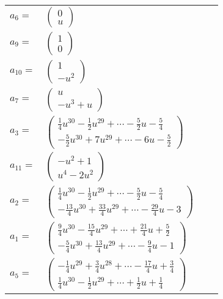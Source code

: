 \documentclass[1p]{elsarticle_modified}
\theoremstyle{definition}
\begin{document}
\begin{tabular}{m{7pt} m{180pt} m{7pt} m{180pt} }
\flushright $a_{6}=$&$\begin{pmatrix}0\\u\end{pmatrix}$ \\
\flushright $a_{9}=$&$\begin{pmatrix}1\\0\end{pmatrix}$ \\
\flushright $a_{10}=$&$\begin{pmatrix}1\\- u^2\end{pmatrix}$ \\
\flushright $a_{7}=$&$\begin{pmatrix}u\\- u^3+u\end{pmatrix}$ \\
\flushright $a_{3}=$&$\begin{pmatrix}\frac{1}{4} u^{30}-\frac{1}{2} u^{29}+\cdots-\frac{5}{2} u-\frac{5}{4}\\-\frac{5}{2} u^{30}+7 u^{29}+\cdots-6 u-\frac{5}{2}\end{pmatrix}$ \\
\flushright $a_{11}=$&$\begin{pmatrix}- u^2+1\\u^4-2 u^2\end{pmatrix}$ \\
\flushright $a_{2}=$&$\begin{pmatrix}\frac{1}{4} u^{30}-\frac{1}{2} u^{29}+\cdots-\frac{5}{2} u-\frac{5}{4}\\-\frac{13}{4} u^{30}+\frac{33}{4} u^{29}+\cdots-\frac{29}{4} u-3\end{pmatrix}$ \\
\flushright $a_{1}=$&$\begin{pmatrix}\frac{9}{4} u^{30}-\frac{15}{4} u^{29}+\cdots+\frac{21}{4} u+\frac{5}{2}\\-\frac{5}{4} u^{30}+\frac{13}{4} u^{29}+\cdots-\frac{9}{4} u-1\end{pmatrix}$ \\
\flushright $a_{5}=$&$\begin{pmatrix}-\frac{1}{4} u^{29}+\frac{3}{4} u^{28}+\cdots-\frac{17}{4} u+\frac{3}{4}\\\frac{1}{4} u^{30}-\frac{1}{2} u^{29}+\cdots+\frac{1}{2} u+\frac{1}{4}\end{pmatrix}$ \\

\end{tabular}
\end{document}
